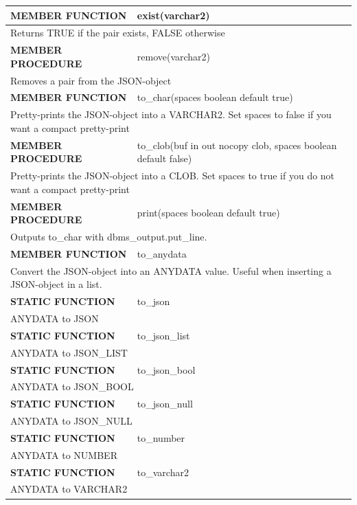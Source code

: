 \documentclass[11pt,twocolumn, a4paper]{article}
\begin{document}
\begin{longtable}{| l | l |}
\hline
  \textbf{MEMBER FUNCTION} & exist(varchar2)\\
\hline
  \multicolumn{2}{|p{15cm}|}{Returns TRUE if the pair exists, FALSE otherwise} \\
\hline

\hline
  \textbf{MEMBER PROCEDURE} & remove(varchar2)\\
\hline
  \multicolumn{2}{|p{15cm}|}{Removes a pair from the JSON-object} \\
\hline

\hline
  \textbf{MEMBER FUNCTION} & to\_char(spaces boolean default true)\\
\hline
  \multicolumn{2}{|p{15cm}|}{Pretty-prints the JSON-object into a VARCHAR2. Set spaces to false if you want a compact pretty-print} \\
\hline

\hline
  \textbf{MEMBER PROCEDURE} & to\_clob(buf in out nocopy clob, spaces boolean default false)\\
\hline
  \multicolumn{2}{|p{15cm}|}{Pretty-prints the JSON-object into a CLOB. Set spaces to true if you do not want a compact pretty-print} \\
\hline

\hline
  \textbf{MEMBER PROCEDURE} & print(spaces boolean default true)\\
\hline
  \multicolumn{2}{|p{15cm}|}{Outputs to\_char with dbms\_output.put\_line.} \\
\hline

\hline
  \textbf{MEMBER FUNCTION} & to\_anydata\\
\hline
  \multicolumn{2}{|p{15cm}|}{Convert the JSON-object into an ANYDATA value. Useful when inserting a JSON-object in a list.} \\
\hline

\hline
  \textbf{STATIC FUNCTION} & to\_json\\
\hline
  \multicolumn{2}{|p{15cm}|}{ANYDATA to JSON} \\
\hline
\hline
  \textbf{STATIC FUNCTION} & to\_json\_list\\
\hline
  \multicolumn{2}{|p{15cm}|}{ANYDATA to JSON\_LIST} \\
\hline
\hline
  \textbf{STATIC FUNCTION} & to\_json\_bool\\
\hline
  \multicolumn{2}{|p{15cm}|}{ANYDATA to JSON\_BOOL} \\
\hline
\hline
  \textbf{STATIC FUNCTION} & to\_json\_null\\
\hline
  \multicolumn{2}{|p{15cm}|}{ANYDATA to JSON\_NULL} \\
\hline
\hline
  \textbf{STATIC FUNCTION} & to\_number\\
\hline
  \multicolumn{2}{|p{15cm}|}{ANYDATA to NUMBER} \\
\hline
\hline
  \textbf{STATIC FUNCTION} & to\_varchar2\\
\hline
  \multicolumn{2}{|p{15cm}|}{ANYDATA to VARCHAR2} \\
\hline

\end{longtable}
\end{document}
